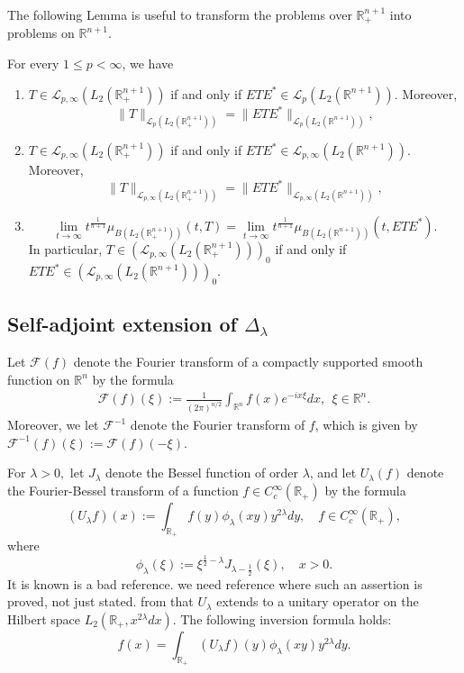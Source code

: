\documentclass{amsart}
\begin{document}
The following Lemma is useful to transform the problems over $\mathbb{R}_+^{n+1}$ into problems on $\mathbb{R}^{n+1}$.
\begin{lemma}\label{half}
For every $1\leq p<\infty$, we have
\begin{enumerate}[{\rm (i)}]
\item $T\in\mathcal{L}_{p,\infty}(L_2(\mathbb{R}_+^{n+1}))$ if and only if $ETE^{\ast}\in\mathcal{L}_{p}(L_2(\mathbb{R}^{n+1}))$. Moreover,
$$\|T\|_{\mathcal{L}_{p}(L_2(\mathbb{R}_+^{n+1}))}=\|ETE^{\ast}\|_{\mathcal{L}_{p}(L_2(\mathbb{R}^{n+1}))},$$
\item $T\in\mathcal{L}_{p,\infty}(L_2(\mathbb{R}_+^{n+1}))$ if and only if $ETE^{\ast}\in\mathcal{L}_{p,\infty}(L_2(\mathbb{R}^{n+1}))$. Moreover,
$$\|T\|_{\mathcal{L}_{p,\infty}(L_2(\mathbb{R}_+^{n+1}))}=\|ETE^{\ast}\|_{\mathcal{L}_{p,\infty}(L_2(\mathbb{R}^{n+1}))},$$
\item
$$\lim_{t\to\infty}t^{\frac1{n+1}}\mu_{B(L_2(\mathbb{R}_+^{n+1}))}(t,T)=\lim_{t\to\infty}t^{\frac1{n+1}}\mu_{B(L_2(\mathbb{R}^{n+1}))}(t,ETE^{\ast}).$$
In particular, $T\in(\mathcal{L}_{p,\infty}(L_2(\mathbb{R}_+^{n+1})))_0$ if and only if $ETE^{\ast}\in(\mathcal{L}_{p,\infty}(L_2(\mathbb{R}^{n+1})))_0.$
\end{enumerate}
\end{lemma}

\subsection{Self-adjoint extension of $\Delta_\lambda$}
Let $\mathcal{F}(f)$ denote the Fourier transform of a compactly supported smooth function on $\mathbb{R}^n$ by the formula
\begin{align*}
\mathcal{F}(f)(\xi):=\frac{1}{(2\pi)^{n/2}}\int_{\mathbb{R}^{n}}f(x)e^{-ix\xi}dx, \ \ \xi\in\mathbb{R}^{n}.
\end{align*}
Moreover, we let $\mathcal{F}^{-1}$ denote the Fourier transform of $f$, which is given by $\mathcal{F}^{-1}(f)(\xi):=\mathcal{F}(f)(-\xi)$.

For $\lambda>0,$ let $J_\lambda$ denote the Bessel function of order $\lambda$, and let $U_{\lambda}(f)$ denote the Fourier-Bessel transform of a function $f\in C^{\infty}_c(\mathbb{R}_+)$ by the formula
$$(U_{\lambda}f)(x):=\int_{\mathbb{R}_+}f(y)\phi_\lambda(xy)y^{2\lambda}dy,\quad f\in C^{\infty}_c(\mathbb{R}_+),$$
where
$$\phi_\lambda(\xi):=\xi^{\frac12-\lambda}J_{\lambda-\frac12}(\xi),\quad x>0.$$
It is known {\color{red} \cite{MS} is a bad reference. we need reference where such an assertion is proved, not just stated.} from \cite{MS} that $U_{\lambda}$ extends to a unitary operator on the Hilbert space $L_2(\mathbb{R}_+,x^{2\lambda}dx).$ The following inversion formula holds:
$$f(x)=\int_{\mathbb{R}_+} (U_{\lambda}f)(y)\phi_{\lambda}(xy)y^{2\lambda}dy.$$
\end{document}
